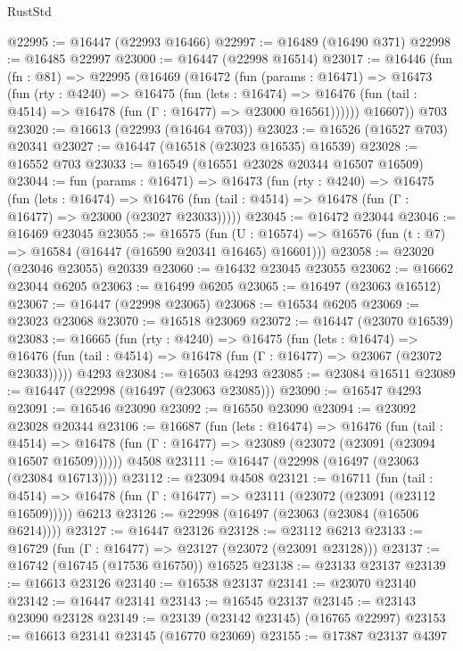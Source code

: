\begin{lexlean}{RustStd}
\begin{coremodule}
@22995 := @16447 (@22993 @16466)
@22997 := @16489 (@16490 @371)
@22998 := @16485 @22997
@23000 := @16447 (@22998 @16514)
@23017 := @16446
    (fun (fn : @81) =>
    @22995
      (@16469
        (@16472
          (fun (params : @16471) =>
          @16473
            (fun (rty : @4240) =>
            @16475
              (fun (lets : @16474) =>
              @16476 (fun (tail : @4514) => @16478 (fun (Γ : @16477) => @23000 @16561))))))
        @16607))
    @703
@23020 := @16613 (@22993 (@16464 @703))
@23023 := @16526 (@16527 @703) @20341
@23027 := @16447 (@16518 (@23023 @16535) @16539)
@23028 := @16552 @703
@23033 := @16549 (@16551 @23028 @20344 @16507 @16509)
@23044 := fun (params : @16471) =>
  @16473
    (fun (rty : @4240) =>
    @16475
      (fun (lets : @16474) =>
      @16476 (fun (tail : @4514) => @16478 (fun (Γ : @16477) => @23000 (@23027 @23033)))))
@23045 := @16472 @23044
@23046 := @16469 @23045
@23055 := @16575
    (fun (U : @16574) => @16576 (fun (t : @7) => @16584 (@16447 (@16590 @20341 @16465) @16601)))
@23058 := @23020 (@23046 @23055) @20339
@23060 := @16432 @23045 @23055
@23062 := @16662 @23044 @6205
@23063 := @16499 @6205
@23065 := @16497 (@23063 @16512)
@23067 := @16447 (@22998 @23065)
@23068 := @16534 @6205
@23069 := @23023 @23068
@23070 := @16518 @23069
@23072 := @16447 (@23070 @16539)
@23083 := @16665
    (fun (rty : @4240) =>
    @16475
      (fun (lets : @16474) =>
      @16476 (fun (tail : @4514) => @16478 (fun (Γ : @16477) => @23067 (@23072 @23033)))))
    @4293
@23084 := @16503 @4293
@23085 := @23084 @16511
@23089 := @16447 (@22998 (@16497 (@23063 @23085)))
@23090 := @16547 @4293
@23091 := @16546 @23090
@23092 := @16550 @23090
@23094 := @23092 @23028 @20344
@23106 := @16687
    (fun (lets : @16474) =>
    @16476
      (fun (tail : @4514) =>
      @16478 (fun (Γ : @16477) => @23089 (@23072 (@23091 (@23094 @16507 @16509))))))
    @4508
@23111 := @16447 (@22998 (@16497 (@23063 (@23084 @16713))))
@23112 := @23094 @4508
@23121 := @16711
    (fun (tail : @4514) => @16478 (fun (Γ : @16477) => @23111 (@23072 (@23091 (@23112 @16509)))))
    @6213
@23126 := @22998 (@16497 (@23063 (@23084 (@16506 @6214))))
@23127 := @16447 @23126
@23128 := @23112 @6213
@23133 := @16729 (fun (Γ : @16477) => @23127 (@23072 (@23091 @23128)))
@23137 := @16742 (@16745 (@17536 @16750)) @16525
@23138 := @23133 @23137
@23139 := @16613 @23126
@23140 := @16538 @23137
@23141 := @23070 @23140
@23142 := @16447 @23141
@23143 := @16545 @23137
@23145 := @23143 @23090 @23128
@23149 := @23139 (@23142 @23145) (@16765 @22997)
@23153 := @16613 @23141 @23145 (@16770 @23069)
@23155 := @17387 @23137 @4397

\end{coremodule}
\end{lexlean}
